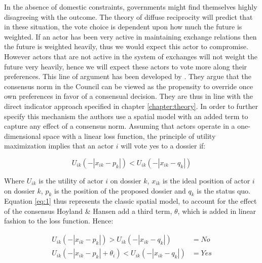 In the absence of domestic constraints, governments might find themselves highly disagreeing with the outcome. The theory of diffuse reciprocity will predict that in these situation, the vote choice is dependent upon how much the future is weighted. If an actor has been very active in maintaining exchange relations then the future is weighted heavily, thus we would expect this actor to compromise. However actors that are not active in the system of exchanges will not weight the future very heavily, hence we will expect these actors to vote more along their preferences. This line of argument has been developed by \citet{HoylandHansen2010}. They argue that the consensus norm in the Council can be viewed as the propensity to override once own preferences in favor of a consensual decision. They are thus in line with the direct indicator approach specified in chapter \ref{chapter:theory}. In order to further specify this mechanism the authors use a spatial model with an added term to capture any effect of a consensus norm. Assuming that actors operate in a one-dimensional space with a linear loss function, the principle of utility maximization implies that an actor $i$ will vote yes to a dossier if:

\begin{equation}
  \label{eq:1}
  U_{ik}(-|x_{ik} - p_k|) < U_{ik}(-|x_{ik} - q_k|)
\end{equation}

Where $U_{ik}$ is the utility of actor $i$ on dossier $k$, $x_{ik}$ is the ideal position of actor $i$ on dossier $k$, $p_k$ is the position of the proposed dossier and $q_k$ is the status quo. Equation \ref{eq:1} thus represents the classic spatial model, to account for the effect of the consensus Hoyland \& Hansen add a third term, $\theta$, which is added in linear fashion to the loss function. Hence:

\begin{align}
  \label{eq:2}
  U_{ik}(-|x_{ik} - p_k|) > U_{ik}(-|x_{ik} - q_k|) &= No \\
  U_{ik}(-|x_{ik} - p_k| + \theta_i) < U_{ik}(-|x_{ik} - q_k|) &= Yes
\end{align}


